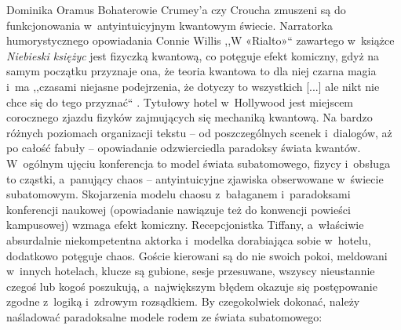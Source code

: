 \begin{artplenv}{Dominika Oramus}
Bohaterowie Crumey’a czy Croucha zmuszeni są do funkcjonowania w~antyintuicyjnym kwantowym świecie. Narratorka humorystycznego opowiadania Connie Willis ,,W «Rialto»`` zawartego w~książce \textit{Niebieski księżyc}
\parencite*[][]{willis_niebieski_2010} %
 jest fizyczką kwantową, co potęguje efekt komiczny, gdyż na samym początku przyznaje ona, że teoria kwantowa to dla niej czarna magia i~ma ,,czasami niejasne podejrzenia, że dotyczy to wszystkich [...] ale nikt nie chce się do tego przyznać`` 
\parencite[][s.~9]{willis_niebieski_2010}. %
 Tytułowy hotel w~Hollywood jest miejscem corocznego zjazdu fizyków zajmujących się mechaniką kwantową. Na bardzo różnych poziomach organizacji tekstu -- od poszczególnych scenek i~dialogów, aż po całość fabuły -- opowiadanie odzwierciedla paradoksy świata kwantów. W~ogólnym ujęciu konferencja to model świata subatomowego, fizycy i~obsługa to cząstki, a~panujący chaos -- antyintuicyjne zjawiska obserwowane w~świecie subatomowym. Skojarzenia modelu chaosu z~bałaganem i~paradoksami konferencji naukowej (opowiadanie nawiązuje też do konwencji powieści kampusowej) wzmaga efekt komiczny. Recepcjonistka Tiffany, a~właściwie absurdalnie niekompetentna aktorka i~modelka dorabiająca sobie w~hotelu, dodatkowo potęguje chaos. Goście kierowani są do nie swoich pokoi, meldowani w~innych hotelach, klucze są gubione, sesje przesuwane, wszyscy nieustannie czegoś lub kogoś poszukują, a~największym błędem okazuje się postępowanie zgodne z~logiką i~zdrowym rozsądkiem. By czegokolwiek dokonać, należy naśladować paradoksalne modele rodem ze świata subatomowego:



\end{artplenv}
